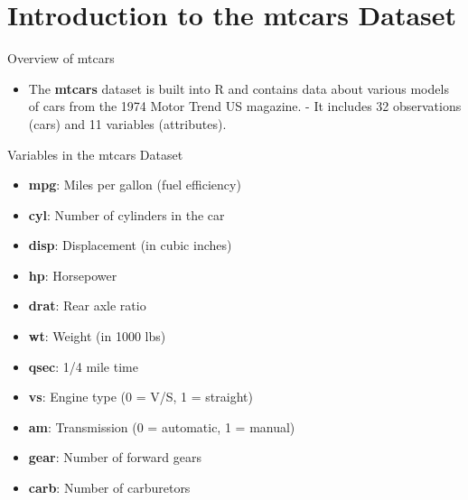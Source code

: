\documentclass[
  18 pt,
  ignorenonframetext,
  aspectratio=1610,
]{beamer}
\providecommand{\tightlist}{%
  \setlength{\itemsep}{0pt}\setlength{\parskip}{0pt}}\usepackage{longtable,booktabs,array}
\begin{document}
\hypertarget{introduction-to-the-mtcars-dataset}{%
\section{Introduction to the mtcars
Dataset}\label{introduction-to-the-mtcars-dataset}}

\begin{frame}{Overview of mtcars}
\protect\hypertarget{overview-of-mtcars}{}
\begin{itemize}
\tightlist
\item
  The \textbf{mtcars} dataset is built into R and contains data about
  various models of cars from the 1974 Motor Trend US magazine. - It
  includes 32 observations (cars) and 11 variables (attributes).
\end{itemize}

\begin{block}{Variables in the mtcars Dataset}
\protect\hypertarget{variables-in-the-mtcars-dataset}{}
\begin{itemize}
\tightlist
\item
  \textbf{mpg}: Miles per gallon (fuel efficiency)
\item
  \textbf{cyl}: Number of cylinders in the car
\item
  \textbf{disp}: Displacement (in cubic inches)
\item
  \textbf{hp}: Horsepower
\item
  \textbf{drat}: Rear axle ratio
\item
  \textbf{wt}: Weight (in 1000 lbs)
\item
  \textbf{qsec}: 1/4 mile time
\item
  \textbf{vs}: Engine type (0 = V/S, 1 = straight)
\item
  \textbf{am}: Transmission (0 = automatic, 1 = manual)
\item
  \textbf{gear}: Number of forward gears
\item
  \textbf{carb}: Number of carburetors
\end{itemize}
\end{block}
\end{frame}
\end{document}

